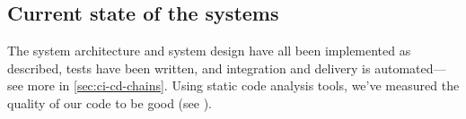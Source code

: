 \subsection{Current state of the systems}
The system architecture and system design have all been implemented as described, tests have been written, and integration and delivery is automated---see more in \autoref{sec:ci-cd-chains}. Using static code analysis tools, we've measured the quality of our code to be good (see ).
